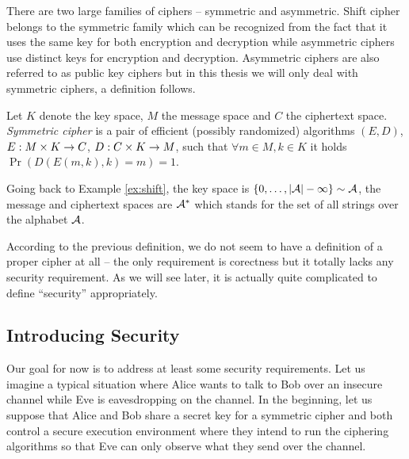 There are two large families of ciphers -- symmetric and asymmetric. Shift cipher belongs to the symmetric family which can be recognized from the fact that it uses the same key for both encryption and decryption while asymmetric ciphers use distinct keys for encryption and decryption. Asymmetric ciphers are also referred to as public key ciphers but in this thesis we will only deal with symmetric ciphers, a definition follows.

\begin{defn}
	Let $K$ denote the key space, $M$ the message space and $C$ the ciphertext space. {\em Symmetric cipher} is a pair of efficient (possibly randomized) algorithms $(E,D)$, $E:M\times K\rightarrow C$, $D:C\times K\rightarrow M$, such that $\forall m\in M, k\in K$ it holds $\Pr\left(D(E(m,k),k)=m\right) = 1$.   %
\end{defn}

\begin{note}
	Going back to Example \ref{ex:shift}, the key space is $\{0 , \ldots , |\cal A|-1\}\sim\cal A$, the message and ciphertext spaces are $\cal A^*$ which stands for the set of all strings over the alphabet $\cal A$.
\end{note}

According to the previous definition, we do not seem to have a definition of a proper cipher at all -- the only requirement is corectness but it totally lacks any security requirement. As we will see later, it is actually quite complicated to define ``security'' appropriately.



\subsection{Introducing Security}

Our goal for now is to address at least some security requirements. Let us imagine a typical situation where Alice wants to talk to Bob over an insecure channel while Eve is eavesdropping on the channel. In the beginning, let us suppose that Alice and Bob share a secret key for a symmetric cipher and both control a secure execution environment where they intend to run the ciphering algorithms so that Eve can only observe what they send over the channel.

